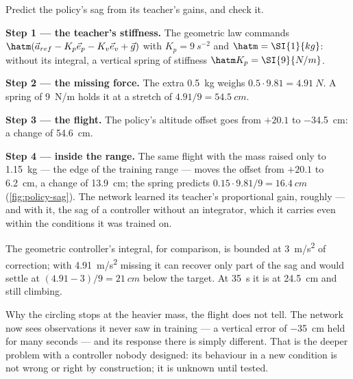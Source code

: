 \begin{example}
\label{ex:policy-sag}
Predict the policy's sag from its teacher's gains, and check it.

\textbf{Step 1 — the teacher's stiffness.} The geometric law commands $\hatm(\vec a_{ref} - K_p\vec e_p - K_v\vec e_v + \vec g)$ with $K_p = \SI{9}{s^{-2}}$ and $\hatm = \SI{1}{kg}$: without its integral, a vertical spring of stiffness $\hatm K_p = \SI{9}{N/m}$.

\textbf{Step 2 — the missing force.} The extra \SI{0.5}{kg} weighs $0.5 \cdot 9.81 = \SI{4.91}{N}$. A spring of \SI{9}{N/m} holds it at a stretch of $4.91/9 = \SI{54.5}{cm}$.

\textbf{Step 3 — the flight.} The policy's altitude offset goes from $+20.1$ to \SI{-34.5}{cm}: a change of \SI{54.6}{cm}.

\textbf{Step 4 — inside the range.} The same flight with the mass raised only to \SI{1.15}{kg} — the edge of the training range — moves the offset from $+20.1$ to \SI{+6.2}{cm}, a change of \SI{13.9}{cm}; the spring predicts $0.15 \cdot 9.81/9 = \SI{16.4}{cm}$ (\cref{fig:policy-sag}). The network learned its teacher's proportional gain, roughly — and with it, the sag of a controller without an integrator, which it carries even within the conditions it was trained on.
\end{example}

The geometric controller's integral, for comparison, is bounded at \SI{3}{m/s^2} of correction; with \SI{4.91}{m/s^2} missing it can recover only part of the sag and would settle at $(4.91 - 3)/9 = \SI{21}{cm}$ below the target. At \SI{35}{s} it is at \SI{24.5}{cm} and still climbing.

Why the circling stops at the heavier mass, the flight does not tell. The network now sees observations it never saw in training — a vertical error of \SI{-35}{cm} held for many seconds — and its response there is simply different. That is the deeper problem with a controller nobody designed: its behaviour in a new condition is not wrong or right by construction; it is unknown until tested.

